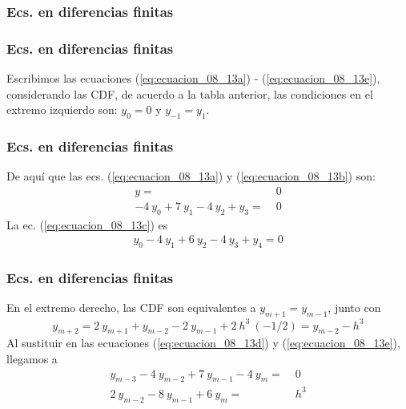 \subsubsection{Ecs. en diferencias finitas}
\begin{frame}
\frametitle{Ecs. en diferencias finitas}
Escribimos las ecuaciones (\ref{eq:ecuacion_08_13a}) - (\ref{eq:ecuacion_08_13e}), considerando las CDF, de acuerdo a la tabla anterior, las condiciones en el extremo izquierdo son: $y_{0} = 0$ y $y_{-1} = y_{1}$.
\end{frame}
\begin{frame}
\frametitle{Ecs. en diferencias finitas}
De aquí que las ecs. (\ref{eq:ecuacion_08_13a}) y (\ref{eq:ecuacion_08_13b}) son:
\begin{align}
y =& \; 0 \label{eq:ecuacion_a} \\
-4 \: y_{0} + 7 \: y_{1} - 4 \: y_{2} + y_{3} =& \; 0 \label{eq:ecuacion_b}
\end{align}
\pause
La ec. (\ref{eq:ecuacion_08_13c}) es
\begin{align}
y_{0} - 4 \: y_{1} + 6 \: y_{2} - 4 \: y_{3} + y_{4} = 0 \label{eq:ecuacion_c}
\end{align}
\end{frame}
\begin{frame}
\frametitle{Ecs. en diferencias finitas}
En el extremo derecho, las CDF son equivalentes a $y_{m+1} = y_{m-1}$, junto con
\[ y_{m+2} =  2 \: y_{m+1} + y_{m-2} - 2 \: y_{m-1} + 2 \: h^{3} \: (-1/2) = y_{m-2} - h^{3}  \]
\pause
Al sustituir en las ecuaciones (\ref{eq:ecuacion_08_13d}) y (\ref{eq:ecuacion_08_13e}), llegamos a
\begin{align}
y_{m-3} - 4 \: y_{m-2} + 7 \: y_{m-1} - 4 \: y_{m} =& \; 0 \label{eq:ecuacion_d}\\
2 \: y_{m-2} - 8 \: y_{m-1} + 6 \: y_{m} =& \; h^{3} \label{eq:ecuacion_e}
\end{align}
\end{frame}
